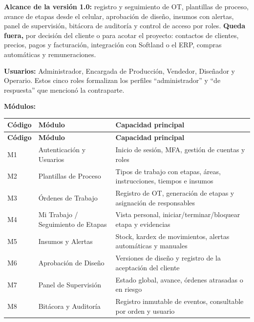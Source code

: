 \documentclass[11pt,a4paper]{article}
\begin{document}
\textbf{Alcance de la versión 1.0:} registro y seguimiento de OT, plantillas de proceso, avance de etapas desde el celular, aprobación de diseño, insumos con alertas, panel de supervisión, bitácora de auditoría y control de acceso por roles. \textbf{Queda fuera,} por decisión del cliente o para acotar el proyecto: contactos de clientes, precios, pagos y facturación, integración con Softland o el ERP, compras automáticas y remuneraciones.

\textbf{Usuarios:} Administrador, Encargada de Producción, Vendedor, Diseñador y Operario. Estos cinco roles formalizan los perfiles ``administrador'' y ``de respuesta'' que mencionó la contraparte.

\textbf{Módulos:}

\begingroup
\begin{longtable}{@{}>{\raggedright\arraybackslash\hspace{0pt}}p{}>{\raggedright\arraybackslash\hspace{0pt}}p{}>{\raggedright\arraybackslash\hspace{0pt}}p{}@{}}
\toprule
\textbf{Código} & \textbf{Módulo} & \textbf{Capacidad principal} \\ \midrule
\endfirsthead
\toprule
\textbf{Código} & \textbf{Módulo} & \textbf{Capacidad principal} \\ \midrule
\endhead
\bottomrule
\endlastfoot
\mbox{M1} & Autenticación y Usuarios & Inicio de sesión, MFA, gestión de cuentas y roles \\ \addlinespace[0.25em]
\mbox{M2} & Plantillas de Proceso & Tipos de trabajo con etapas, áreas, instrucciones, tiempos e insumos \\ \addlinespace[0.25em]
\mbox{M3} & Órdenes de Trabajo & Registro de OT, generación de etapas y asignación de responsables \\ \addlinespace[0.25em]
\mbox{M4} & Mi Trabajo / Seguimiento de Etapas & Vista personal, iniciar/terminar/bloquear etapa y evidencias \\ \addlinespace[0.25em]
\mbox{M5} & Insumos y Alertas & Stock, kardex de movimientos, alertas automáticas y manuales \\ \addlinespace[0.25em]
\mbox{M6} & Aprobación de Diseño & Versiones de diseño y registro de la aceptación del cliente \\ \addlinespace[0.25em]
\mbox{M7} & Panel de Supervisión & Estado global, avance, órdenes atrasadas o en riesgo \\ \addlinespace[0.25em]
\mbox{M8} & Bitácora y Auditoría & Registro inmutable de eventos, consultable por orden y usuario \\
\end{longtable}
\endgroup
\end{document}
